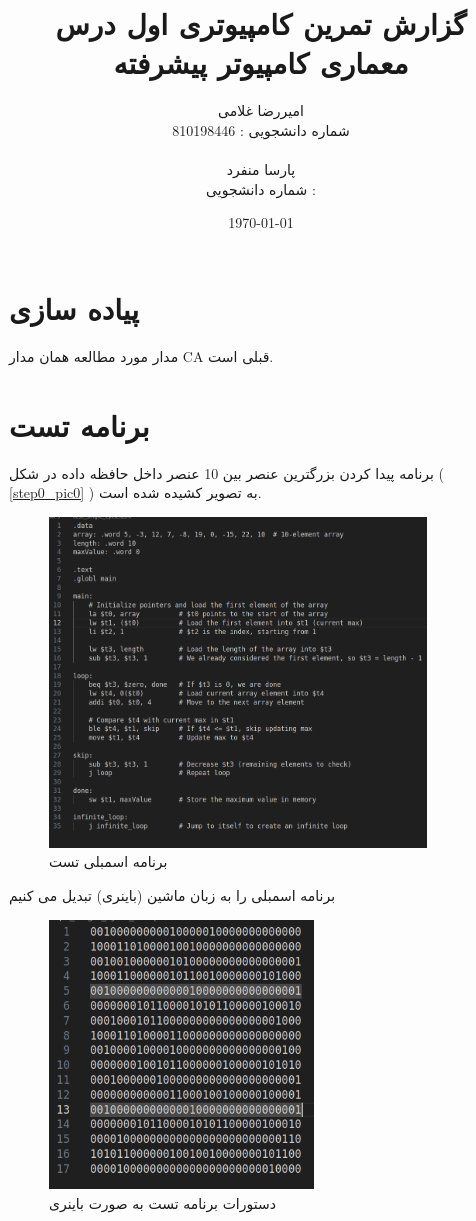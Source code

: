 \documentclass[11pt, a4paper]{article}
\title{گزارش تمرین کامپیوتری اول درس معماری کامپیوتر پیشرفته}
\author{ امیررضا غلامی\mm \\
	شماره دانشجویی : 810198446 \\
	\\
	پارسا منفرد \\
	شماره دانشجویی :
}
\date{\today}
\begin{document}
	\maketitle
	\vspace{15cm}
	\tableofcontents
	
	\pagebreak


	\section{پیاده سازی 
		}
		مدار مورد مطالعه همان مدار CA قبلی است.
	

		
	\section{برنامه تست}
	برنامه پیدا کردن بزرگترین عنصر بین 10 عنصر داخل حافظه داده در شکل (
	\ref{step0_pic0}
	)
	به تصویر کشیده شده است. 
	\begin{figure}[H]
		\begin{center}
			\includegraphics[width=10cm]{Photos/1.png}
		\end{center}
		\caption{برنامه اسمبلی تست}
		\label{test_asm}
	\end{figure}
	
	برنامه اسمبلی را به زبان ماشین (باینری) تبدیل می کنیم
	\begin{figure}[H]
		\begin{center}
			\includegraphics[width=7cm]{Photos/2.png}
		\end{center}
		\caption{دستورات برنامه تست به صورت باینری}
		\label{Inst_Mem}
	\end{figure}
	
\end{document}
